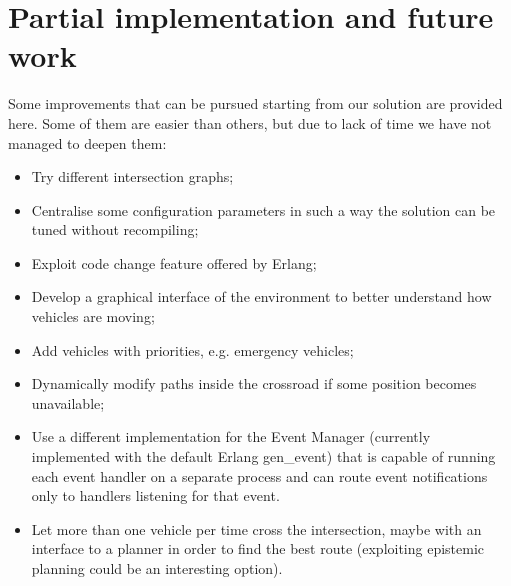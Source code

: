 \documentclass{memoir}
\begin{document}
\section{Partial implementation and future work}
Some improvements that can be pursued starting from our solution are provided here. Some of them are easier than others, but due to lack of time we have not managed to deepen them:
\begin{itemize}
	\item Try different intersection graphs;
	\item Centralise some configuration parameters in such a way the solution can be tuned without recompiling;
	\item Exploit code change feature offered by Erlang;
	\item Develop a graphical interface of the environment to better understand how vehicles are moving;
	\item Add vehicles with priorities, e.g. emergency vehicles;
	\item Dynamically modify paths inside the crossroad if some position becomes unavailable;
	\item Use a different implementation for the Event Manager (currently implemented with the default Erlang gen\_event) that is capable of running each event handler on a separate process and can route event notifications only to handlers listening for that event.
	\item Let more than one vehicle per time cross the intersection, maybe with an interface to a planner in order to find the best route (exploiting epistemic planning could be an interesting option).
\end{itemize}
\end{document}
